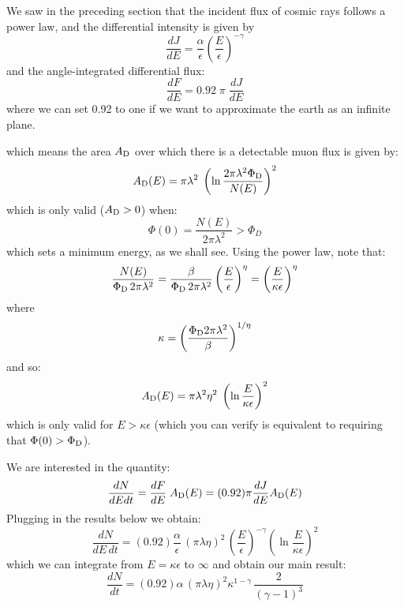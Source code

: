 \documentclass[12pt]{article}
\begin{document}
We saw in the preceding section that the incident flux of cosmic rays
follows a power law, and the differential intensity is given by
$$ \frac{dJ}{dE} = \frac{\alpha}{\epsilon} \left( \frac{E}{\epsilon} \right)^{-\gamma} $$
and the angle-integrated differential flux:
$$ \frac{dF}{dE} = 0.92 \; \pi \; \frac{dJ}{dE} $$
where we can set 0.92 to one if we want to approximate the earth as an
infinite plane.



which means the area $A_{\rm D}$ over which there is a detectable muon flux is given by:
$$A_{\rm D}(E) = \pi \lambda^2 \; \left( \ln \frac{2 \pi \lambda^2 \Phi_{\rm D}}{N(E)} \right)^2$$
which is only valid ($A_{\rm D} > 0$) when:
$$\Phi(0) = \frac{N(E)}{2\pi\lambda^2} > \Phi_D$$
which sets a minimum energy, as we shall see.  Using the power law, note that:
$$\frac{N(E)}{\Phi_{\rm D} \, 2\pi\lambda^2}
= \frac{\beta}{\Phi_{\rm D} \, 2\pi\lambda^2} \left( \frac{E}{\epsilon}\right)^{\eta} = \left( \frac{E}{\kappa \epsilon}\right)^{\eta}$$
where
\begin{equation}
\kappa = \left( \frac{\Phi_{\rm D} 2 \pi \lambda^2}{\beta}\right)^{1/\eta}
\end{equation}
and so:
\begin{equation}
A_{\rm D}(E) = \pi \lambda^2 \eta^2 \; \left( \ln \frac{E}{\kappa \epsilon} \right)^2
\end{equation}
which is only valid for $E > \kappa \epsilon$ (which you can verify is equivalent to requiring that $\Phi(0) > \Phi_{\rm D}$).

We are interested in the quantity:
\begin{equation}
\frac{dN}{dE dt} = \frac{dF}{dE} \; A_{\rm D}(E) = (0.92) \pi \frac{dJ}{dE} A_{\rm D}(E)
\end{equation}
Plugging in the results below we obtain:
\begin{equation}
\frac{dN}{dE \, dt} = (0.92) \frac{\alpha}{\epsilon} \, (\pi \lambda \eta)^2 \, \left( \frac{E}{\epsilon}\right)^{-\gamma}
\left( \ln \frac{E}{\kappa \epsilon}\right)^2
\end{equation}
which we can integrate from $E=\kappa \epsilon$ to $\infty$ and obtain our main result:
\begin{equation}
  \frac{dN}{dt} = (0.92) \alpha \, (\pi \lambda \eta)^2 \kappa^{1-\gamma} \,
  \frac{2}{(\gamma - 1)^3}
\end{equation}
\end{document}
